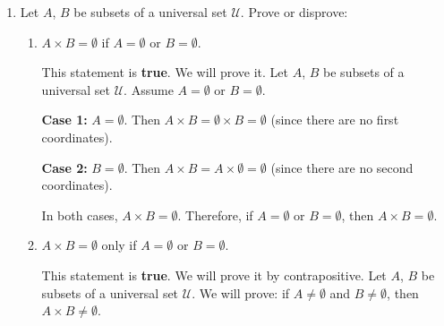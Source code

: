 \begin{enumerate}
\begin{enumerate}
\begin{subprove}
      \textbf{Forward containment:} Let $x \in B$ be arbitrary.
      Since $x \in B$, we have $x \in A \cup B = A \cup C$.
      Therefore, $x \in A$ or $x \in C$.
      \begin{itemize}
        \item If $x \in A$, then $x \in A \cap B = A \cap C$, so $x \in C$.
        \item If $x \in C$, then we are done.
      \end{itemize}
      In both cases, $x \in C$. Hence, $B \subseteq C$.
      
      \textbf{Reverse containment:} Let $x \in C$ be arbitrary.
      Since $x \in C$, we have $x \in A \cup C = A \cup B$.
      Therefore, $x \in A$ or $x \in B$.
      \begin{itemize}
        \item If $x \in A$, then $x \in A \cap C = A \cap B$, so $x \in B$.
        \item If $x \in B$, then we are done.
      \end{itemize}
      In both cases, $x \in B$. Hence, $C \subseteq B$.
      
      Since both containments hold, $B = C$.
    \end{subprove}
  \end{enumerate}

  \item Let $A$, $B$ be subsets of a universal set $\mathcal{U}$.
  Prove or disprove:
  \begin{enumerate}
    \item $A \times B = \emptyset$ if $A = \emptyset$ or $B = \emptyset$.
    \begin{subprove}
      This statement is \textbf{true}. We will prove it.
      Let $A$, $B$ be subsets of a universal set $\mathcal{U}$.
      Assume $A = \emptyset$ or $B = \emptyset$.
      
      \textbf{Case 1:} $A = \emptyset$.
      Then $A \times B = \emptyset \times B = \emptyset$ (since there are no first coordinates).
      
      \textbf{Case 2:} $B = \emptyset$.
      Then $A \times B = A \times \emptyset = \emptyset$ (since there are no second coordinates).
      
      In both cases, $A \times B = \emptyset$.
      Therefore, if $A = \emptyset$ or $B = \emptyset$, then $A \times B = \emptyset$.
    \end{subprove}
    
    \item $A \times B = \emptyset$ only if $A = \emptyset$ or $B = \emptyset$.
    \begin{subprove}
      This statement is \textbf{true}. We will prove it by contrapositive.
      Let $A$, $B$ be subsets of a universal set $\mathcal{U}$.
      We will prove: if $A \neq \emptyset$ and $B \neq \emptyset$, then $A \times B \neq \emptyset$.
      

\end{subprove}
\end{enumerate}
\end{enumerate}

